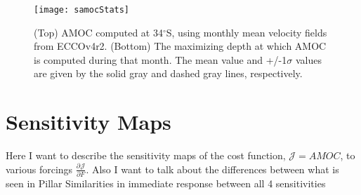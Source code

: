 \documentclass[a4paper,11pt]{article}
\newcommand{\pderiv}[3][]{%
  \ensuremath{\frac{\partial^{#1} {#2}}{\partial {#3}^{#1}}}}
\newcommand{\degSym}{$^{\circ}$}
\begin{document}
   \begin{figure}
    \centering
    \texttt{[image: samocStats]}
    \caption{(Top) AMOC computed at 34\degSym S, using monthly mean velocity fields from ECCOv4r2. (Bottom) The maximizing depth at which AMOC is computed during that month. The mean value and +/-1$\sigma$ values are given by the solid gray and dashed gray lines, respectively.}
    \label{fig:samocStats}
   \end{figure}


 \section{Sensitivity Maps}

  
  Here I want to describe the sensitivity maps of the cost function, $\mathcal{J} = AMOC$, to various forcings $\pderiv{\mathcal{J}}{F}$. 
  Also I want to talk about the differences between what is seen in Pillar 
  Similarities in immediate response between all 4 sensitivities 
  
\end{document}
